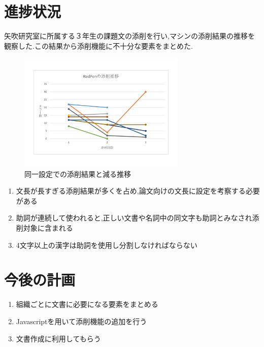 \documentclass[uplatex,twocolumn,dvipdfmx]{jsarticle}
\begin{document}
\section{進捗状況}
矢吹研究室に所属する３年生の課題文の添削を行い,マシンの添削結果の推移を観察した.この結果から添削機能に不十分な要素をまとめた.
\begin{figure}[h]
\centering
\includegraphics[width=8cm,clip]{images.pdf}
\caption{同一設定での添削結果と減る推移}\label{サンプル図}
\end{figure}

\begin{enumerate}
 \item 文長が長すぎる添削結果が多くを占め,論文向けの文長に設定を考察する必要がある
 \item 助詞が連続して使われると,正しい文書や名詞中の同文字も助詞とみなされ添削対象に含まれる
 \item 4文字以上の漢字は助詞を使用し分割しなければならない
\end{enumerate}

\section{今後の計画}
\begin{enumerate}
 \item 組織ごとに文書に必要になる要素をまとめる
 \item Javascriptを用いて添削機能の追加を行う
 \item 文書作成に利用してもらう
\end{enumerate}



\end{document}
